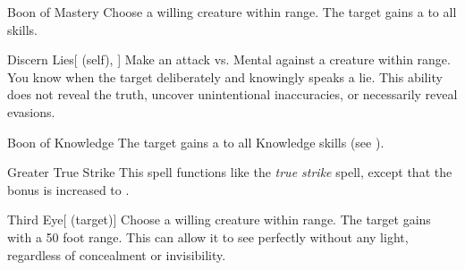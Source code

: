\lowercase{\hypertarget{spell:Boon of Mastery}{}}\label{spell:Boon of Mastery}
\begin{ability}[\nth{2}]{\hypertarget{spell:Boon of Mastery}{Boon of Mastery}}
Choose a willing creature within \rngclose range.
The target gains a   to all skills.
\end{ability}
\vspace{0.25em}



\lowercase{\hypertarget{spell:Discern Lies}{}}\label{spell:Discern Lies}
\begin{ability}[\nth{2}]{\hypertarget{spell:Discern Lies}{Discern Lies}}[ (self), ]
Make an attack vs. Mental against a creature within \rngmed range.
\hit You know when the target deliberately and knowingly speaks a lie.
This ability does not reveal the truth, uncover unintentional inaccuracies, or necessarily reveal evasions.
\end{ability}
\vspace{0.25em}



\lowercase{\hypertarget{spell:Boon of Knowledge}{}}\label{spell:Boon of Knowledge}
\begin{ability}[\nth{3}]{\hypertarget{spell:Boon of Knowledge}{Boon of Knowledge}}
The target gains a   to all Knowledge skills (see ).
\end{ability}
\vspace{0.25em}



\lowercase{\hypertarget{spell:Greater True Strike}{}}\label{spell:Greater True Strike}
\begin{ability}[\nth{3}]{\hypertarget{spell:Greater True Strike}{Greater True Strike}}
This spell functions like the \textit{true strike} spell, except that the bonus is increased to .
\end{ability}
\vspace{0.25em}



\lowercase{\hypertarget{spell:Third Eye}{}}\label{spell:Third Eye}
\begin{ability}[\nth{3}]{\hypertarget{spell:Third Eye}{Third Eye}}[ (target)]
Choose a willing creature within \rngclose range.
The target gains  with a 50 foot range.
This can allow it to see perfectly without any light, regardless of concealment or invisibility.
\end{ability}
\vspace{0.25em}



